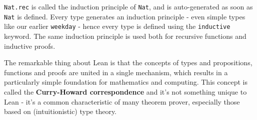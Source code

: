 \documentclass{book}
\theoremstyle{definition}
\theoremstyle{remark}
\theoremstyle{plain}
\begin{document}
\lstinline{Nat.rec} is called the induction principle of \lstinline{Nat},
and is auto-generated as soon as \lstinline{Nat} is defined.
Every type generates an induction principle - even simple types like our earlier \lstinline{weekday} -
hence every type is defined using the \lstinline{inductive} keyword.
The same induction principle is used both for recursive functions and inductive proofs.

The remarkable thing about Lean is that the concepts of types and propositions, functions and proofs are united in a single mechanism,
which results in a particularly simple foundation for mathematics and computing.
This concept is called the \textbf{Curry-Howard correspondence} and it's not something unique to Lean -
it's a common characteristic of many theorem prover, especially those based on (intuitionistic) type theory.
\end{document}
